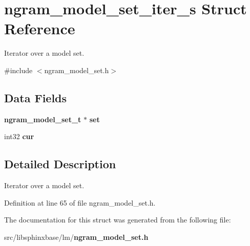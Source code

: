 \section{ngram\-\_\-model\-\_\-set\-\_\-iter\-\_\-s Struct Reference}
\label{structngram__model__set__iter__s}


Iterator over a model set.  




{\ttfamily \#include $<$ngram\-\_\-model\-\_\-set.\-h$>$}

\subsection*{Data Fields}
\begin{DoxyCompactItemize}
\item 
{\bf ngram\-\_\-model\-\_\-set\-\_\-t} $\ast$ {\bfseries set}\label{structngram__model__set__iter__s_ac03199d884b9ed641141a1512f87b0cc}

\item 
int32 {\bfseries cur}\label{structngram__model__set__iter__s_afe1dd087a0beb86a29549785ab394f91}

\end{DoxyCompactItemize}


\subsection{Detailed Description}
Iterator over a model set. 

Definition at line 65 of file ngram\-\_\-model\-\_\-set.\-h.



The documentation for this struct was generated from the following file\-:\begin{DoxyCompactItemize}
\item 
src/libsphinxbase/lm/{\bf ngram\-\_\-model\-\_\-set.\-h}\end{DoxyCompactItemize}
